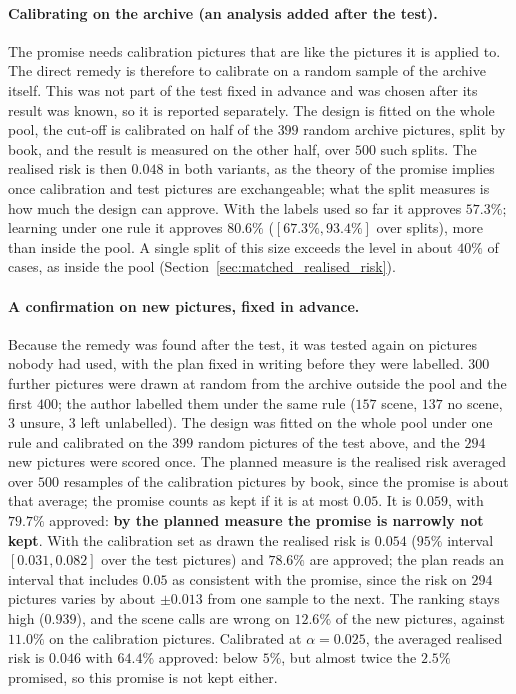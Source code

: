 \paragraph{Calibrating on the archive (an analysis added after the test).} The promise needs calibration pictures that are like the pictures it is applied to. The direct remedy is therefore to calibrate on a random sample of the archive itself. This was not part of the test fixed in advance and was chosen after its result was known, so it is reported separately. The design is fitted on the whole pool, the cut-off is calibrated on half of the $399$ random archive pictures, split by book, and the result is measured on the other half, over $500$ such splits. The realised risk is then $0.048$ in both variants, as the theory of the promise implies once calibration and test pictures are exchangeable; what the split measures is how much the design can approve. With the labels used so far it approves $57.3\%$; learning under one rule it approves $80.6\%$ ($[67.3\%, 93.4\%]$ over splits), more than inside the pool. A single split of this size exceeds the level in about $40\%$ of cases, as inside the pool (Section~\ref{sec:matched_realised_risk}).

\paragraph{A confirmation on new pictures, fixed in advance.} Because the remedy was found after the test, it was tested again on pictures nobody had used, with the plan fixed in writing before they were labelled. $300$ further pictures were drawn at random from the archive outside the pool and the first $400$; the author labelled them under the same rule ($157$ scene, $137$ no scene, $3$ unsure, $3$ left unlabelled). The design was fitted on the whole pool under one rule and calibrated on the $399$ random pictures of the test above, and the $294$ new pictures were scored once. The planned measure is the realised risk averaged over $500$ resamples of the calibration pictures by book, since the promise is about that average; the promise counts as kept if it is at most $0.05$. It is $0.059$, with $79.7\%$ approved: \textbf{by the planned measure the promise is narrowly not kept}. With the calibration set as drawn the realised risk is $0.054$ ($95\%$ interval $[0.031, 0.082]$ over the test pictures) and $78.6\%$ are approved; the plan reads an interval that includes $0.05$ as consistent with the promise, since the risk on $294$ pictures varies by about $\pm 0.013$ from one sample to the next. The ranking stays high ($0.939$), and the scene calls are wrong on $12.6\%$ of the new pictures, against $11.0\%$ on the calibration pictures. Calibrated at $\alpha = 0.025$, the averaged realised risk is $0.046$ with $64.4\%$ approved: below $5\%$, but almost twice the $2.5\%$ promised, so this promise is not kept either.

